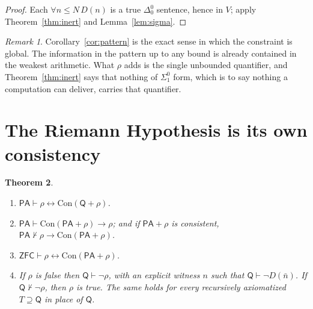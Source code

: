 \documentclass[11pt]{article}
\newtheorem{theorem}{Theorem}[section]
\theoremstyle{definition}
\theoremstyle{remark}
\newtheorem{remark}[theorem]{Remark}
\newcommand{\PA}{\mathsf{PA}}
\newcommand{\ZFC}{\mathsf{ZFC}}
\newcommand{\RA}{\mathsf{Q}}
\newcommand{\Con}{\mathrm{Con}}
\newcommand{\Sigone}{\Sigma^0_1}
\newcommand{\Dzero}{\Delta^0_0}
\begin{document}
\begin{proof}
Each $\forall n\le N\,D(n)$ is a true $\Dzero$ sentence, hence in $V$; apply Theorem~\ref{thm:inert} and Lemma~\ref{lem:sigma}.
\end{proof}

\begin{remark}
Corollary~\ref{cor:pattern} is the exact sense in which the constraint is global. The information in the pattern up to any bound is already contained in the weakest arithmetic. What $\rho$ adds is the single unbounded quantifier, and Theorem~\ref{thm:inert} says that nothing of $\Sigone$ form, which is to say nothing a computation can deliver, carries that quantifier.
\end{remark}

\section{The Riemann Hypothesis is its own consistency}

\begin{theorem}\label{thm:self}
\begin{enumerate}
\item[(i)] $\PA\vdash\rho\leftrightarrow\Con(\RA+\rho)$.
\item[(ii)] $\PA\vdash\Con(\PA+\rho)\to\rho$; and if $\PA+\rho$ is consistent, $\PA\nvdash\rho\to\Con(\PA+\rho)$.
\item[(iii)] $\ZFC\vdash\rho\leftrightarrow\Con(\PA+\rho)$.
\item[(iv)] If $\rho$ is false then $\RA\vdash\neg\rho$, with an explicit witness $n$ such that $\RA\vdash\neg D(\bar n)$. If $\RA\nvdash\neg\rho$, then $\rho$ is true. The same holds for every recursively axiomatized $T\supseteq\RA$ in place of $\RA$.
\end{enumerate}
\end{theorem}
\end{document}
